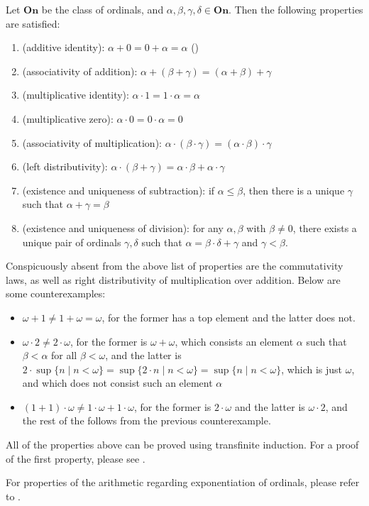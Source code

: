 \documentclass[12pt]{article}
\begin{document}
Let $\textbf{On}$ be the class of ordinals, and $\alpha,\beta,\gamma,\delta\in \textbf{On}$.  Then the following properties are satisfied:
\begin{enumerate}
\item (additive identity): $\alpha+0=0+\alpha=\alpha$ ()
\item (associativity of addition): $\alpha+(\beta+\gamma)=(\alpha+\beta)+\gamma$
\item (multiplicative identity): $\alpha\cdot 1=1\cdot \alpha=\alpha$
\item (multiplicative zero): $\alpha\cdot 0 = 0\cdot \alpha=0$
\item (associativity of multiplication): $\alpha\cdot (\beta\cdot \gamma)=(\alpha\cdot \beta)\cdot \gamma$
\item (left distributivity): $\alpha\cdot(\beta+\gamma)=\alpha\cdot \beta+\alpha\cdot \gamma$
\item (existence and uniqueness of subtraction): if $\alpha\le \beta$, then there is a unique $\gamma$ such that $\alpha+\gamma=\beta$
\item (existence and uniqueness of division): for any $\alpha,\beta$ with $\beta\ne 0$, there exists a unique pair of ordinals $\gamma,\delta$ such that $\alpha=\beta\cdot \delta+\gamma$ and $\gamma<\beta$.
\end{enumerate}

Conspicuously absent from the above list of properties are the commutativity laws, as well as right distributivity of multiplication over addition.  Below are some  counterexamples:
\begin{itemize}
\item $\omega+1\ne 1+\omega=\omega$, for the former has a top element and the latter does not.
\item $\omega\cdot 2\ne 2\cdot \omega$, for the former is $\omega+\omega$, which consists an element $\alpha$ such that $\beta<\alpha$ for all $\beta<\omega$, and the latter is $2\cdot \sup \lbrace n\mid n<\omega\rbrace = \sup \lbrace 2\cdot n\mid n<\omega \rbrace =\sup \lbrace n\mid n<\omega\rbrace$, which is just $\omega$, and which does not consist such an element $\alpha$
\item $(1+1)\cdot \omega\ne 1\cdot \omega+1\cdot \omega$, for the former is $2\cdot \omega$ and the latter is $\omega\cdot 2$, and the rest of the  follows from the previous counterexample.
\end{itemize}

All of the properties above can be proved using transfinite induction.  For a proof of the first property, please see .

For properties of the arithmetic regarding exponentiation of ordinals, please refer to .
\end{document}
